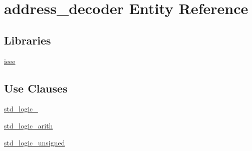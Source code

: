 \hypertarget{classaddress__decoder}{}\section{address\+\_\+decoder Entity Reference}
\label{classaddress__decoder}
\subsection*{Libraries}
 \begin{DoxyCompactItemize}
\item 
\hyperlink{classaddress__decoder_a208b4a843c28bfacfc6c74a4276b6bdc}{ieee} \hypertarget{classaddress__decoder_a208b4a843c28bfacfc6c74a4276b6bdc}{}\label{classaddress__decoder_a208b4a843c28bfacfc6c74a4276b6bdc}

\end{DoxyCompactItemize}
\subsection*{Use Clauses}
 \begin{DoxyCompactItemize}
\item 
\hyperlink{classaddress__decoder_a857dcc5744990407561591d2d5707aa6}{std\+\_\+logic\+\_}   \hypertarget{classaddress__decoder_a857dcc5744990407561591d2d5707aa6}{}\label{classaddress__decoder_a857dcc5744990407561591d2d5707aa6}

\item 
\hyperlink{classaddress__decoder_abad2c79fa67df291d77257264ebeb001}{std\+\_\+logic\+\_\+arith}   \hypertarget{classaddress__decoder_abad2c79fa67df291d77257264ebeb001}{}\label{classaddress__decoder_abad2c79fa67df291d77257264ebeb001}

\item 
\hyperlink{classaddress__decoder_a267da23b46488123df8cd107a646dbb5}{std\+\_\+logic\+\_\+unsigned}   \hypertarget{classaddress__decoder_a267da23b46488123df8cd107a646dbb5}{}\label{classaddress__decoder_a267da23b46488123df8cd107a646dbb5}

\end{DoxyCompactItemize}
